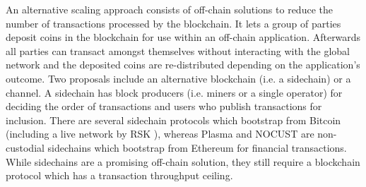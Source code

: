 \documentclass{llncs}
\begin{document}
	An alternative scaling approach consists of off-chain solutions to reduce the number of transactions processed by the blockchain.
	It lets a group of parties deposit coins in the blockchain for use within an off-chain application.
	Afterwards all parties can transact amongst themselves without interacting with the global network and the deposited coins are re-distributed depending on the application's outcome. 
	Two proposals include an alternative blockchain (i.e. a sidechain) or a channel. 
	A sidechain has block producers (i.e. miners or a single operator) for deciding the order of transactions and users who publish transactions for inclusion. 
	There are several sidechain protocols \cite{back2014enabling,dilley2016strong} which bootstrap from Bitcoin (including a live network by RSK \cite{sidechainrsk}), whereas Plasma\cite{poon2017plasma} and NOCUST\cite{khalilnocust} are non-custodial sidechains which bootstrap from Ethereum for financial transactions.
	While sidechains are a promising off-chain solution, they still require a blockchain protocol which has a transaction throughput ceiling.
	
\end{document}
